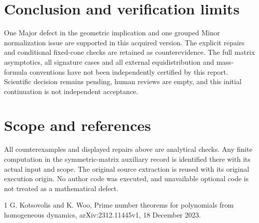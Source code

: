 \documentclass[10pt]{article}
\begin{document}
\section*{Conclusion and verification limits}
One Major defect in the geometric implication and one grouped Minor normalization issue are supported in this acquired version. The explicit repairs and conditional fixed-cone checks are retained as counterevidence. The full matrix asymptotics, all signature cases and all external equidistribution and mass-formula conventions have not been independently certified by this report. Scientific decision remains pending, human reviews are empty, and this initial continuation is not independent acceptance.\par
\section*{Scope and references}
All counterexamples and displayed repairs above are analytical checks. Any finite computation in the symmetric-matrix auxiliary record is identified there with its actual input and scope. The original source extraction is reused with its original execution origin. No author code was executed, and unavailable optional code is not treated as a mathematical defect.\par
1 G. Kotsovolis and K. Woo, Prime number theorems for polynomials from homogeneous dynamics, arXiv:2312.11445v1, 18 December 2023.\par
\end{document}
